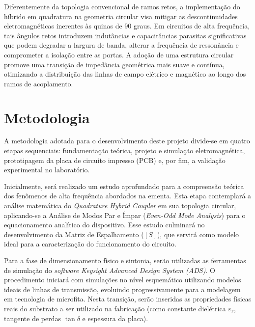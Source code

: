 \documentclass[article, oneside, oldfontcommands]{abntex2}
\begin{document}
Diferentemente da topologia convencional de ramos retos, a implementação do híbrido em quadratura na geometria circular visa mitigar as descontinuidades eletromagnéticas inerentes às quinas de 90 graus. Em circuitos de alta frequência, tais ângulos retos introduzem indutâncias e capacitâncias parasitas significativas que podem degradar a largura de banda, alterar a frequência de ressonância e comprometer a isolação entre as portas. A adoção de uma estrutura circular promove uma transição de impedância geométrica mais suave e contínua, otimizando a distribuição das linhas de campo elétrico e magnético ao longo dos ramos de acoplamento. \\

\noindent \cite{pozar2011microwave} \cite{sinchangreed2011design} \cite{stec2018quadrature} \cite{rahman2018quadrature} \cite{zeng2022compact} \cite{grebennikov2008power}

\section{Metodologia}

A metodologia adotada para o desenvolvimento deste projeto divide-se em quatro etapas sequenciais: fundamentação teórica, projeto e simulação eletromagnética, prototipagem da placa de circuito impresso (PCB) e, por fim, a validação experimental no laboratório.

Inicialmente, será realizado um estudo aprofundado para a compreensão teórica dos fenômenos de alta frequência abordados na ementa. 
Esta etapa contemplará a análise matemática do \textit{Quadrature Hybrid Coupler} em sua topologia circular, aplicando-se a Análise de Modos Par e Ímpar (\textit{Even-Odd Mode Analysis}) para o equacionamento analítico do dispositivo. Esse estudo culminará no desenvolvimento da Matriz de Espalhamento ($[S]$), que servirá como modelo ideal para a caracterização do funcionamento do circuito.

Para a fase de dimensionamento físico e sintonia, serão utilizadas as ferramentas de simulação do \textit{software Keysight Advanced Design System (ADS)}. O procedimento iniciará com simulações no nível esquemático utilizando modelos ideais de linhas de transmissão, evoluindo progressivamente para a modelagem em tecnologia de microfita. 
Nesta transição, serão inseridas as propriedades físicas reais do substrato a ser utilizado na fabricação (como constante dielétrica $\varepsilon_r$, tangente de perdas $\tan \delta$ e espessura da placa). 
\end{document}

